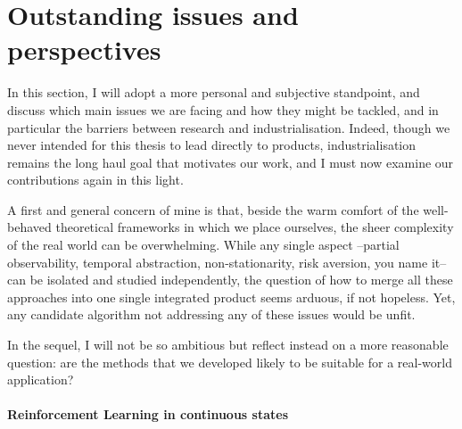 \section{Outstanding issues and perspectives}

In this section, I will adopt a more personal and subjective standpoint, and discuss which main issues we are facing and how they might be tackled, and in particular the barriers between research and industrialisation.
Indeed, though we never intended for this thesis to lead directly to products, industrialisation remains the long haul goal that motivates our work, and I must now examine our contributions again in this light.

A first and general concern of mine is that, beside the warm comfort of the well-behaved theoretical frameworks in which we place ourselves, the sheer complexity of the real world can be overwhelming. While any single aspect --partial observability, temporal abstraction, non-stationarity, risk aversion, you name it-- can be isolated and studied independently, the question of how to merge all these approaches into one single integrated product seems arduous, if not hopeless. Yet, any candidate algorithm not addressing any of these issues would be unfit.

In the sequel, I will not be so ambitious but reflect instead on a more reasonable question: are the methods that we developed likely to be suitable for a real-world application?

\paragraph{Reinforcement Learning in continuous states}

